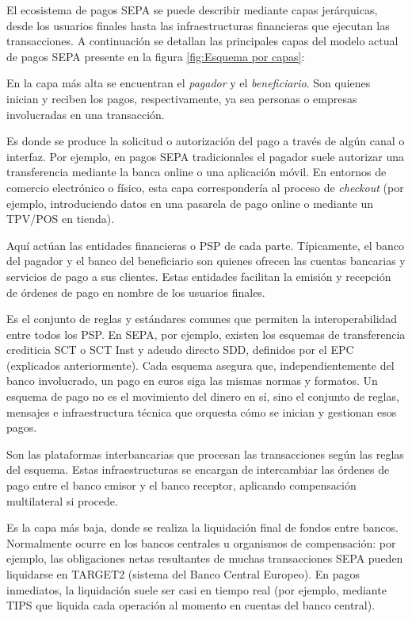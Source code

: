 El ecosistema de pagos SEPA se puede describir mediante capas jerárquicas, desde los usuarios finales hasta las infraestructuras financieras que ejecutan las transacciones. A continuación se detallan las principales capas del modelo actual de pagos SEPA presente en la figura \ref{fig:Esquema por capas}:

\begin{description}[itemsep=15pt, parsep=0pt]
  \item[\textbf{Capa de usuarios finales.}] 
    En la capa más alta se encuentran el \emph{pagador} y el \emph{beneficiario}. Son quienes inician y reciben los pagos, respectivamente, ya sea personas o empresas involucradas en una transacción.
  \item[\textbf{Capa de iniciación o interacción.}] 
    Es donde se produce la solicitud o autorización del pago a través de algún canal o interfaz. Por ejemplo, en pagos SEPA tradicionales el pagador suele autorizar una transferencia mediante la banca online o una aplicación móvil. En entornos de comercio electrónico o físico, esta capa correspondería al proceso de \emph{checkout} (por ejemplo, introduciendo datos en una pasarela de pago online o mediante un TPV/POS en tienda).
  \item[\textbf{Capa de proveedores de servicios de pago (PSP).}] 
    Aquí actúan las entidades financieras o PSP de cada parte. Típicamente, el banco del pagador y el banco del beneficiario son quienes ofrecen las cuentas bancarias y servicios de pago a sus clientes. Estas entidades facilitan la emisión y recepción de órdenes de pago en nombre de los usuarios finales.
  \item[\textbf{Capa de esquemas de pago SP.}] 
    Es el conjunto de reglas y estándares comunes que permiten la interoperabilidad entre todos los PSP. En SEPA, por ejemplo, existen los esquemas de transferencia crediticia SCT o SCT Inst y adeudo directo SDD, definidos por el EPC (explicados anteriormente). Cada esquema asegura que, independientemente del banco involucrado, un pago en euros siga las mismas normas y formatos. Un esquema de pago no es el movimiento del dinero en sí, sino el conjunto de reglas, mensajes e infraestructura técnica que orquesta cómo se inician y gestionan esos pagos.
  \item[\textbf{Capa de infraestructuras de compensación.}] 
    Son las plataformas interbancarias que procesan las transacciones según las reglas del esquema. Estas infraestructuras se encargan de intercambiar las órdenes de pago entre el banco emisor y el banco receptor, aplicando compensación multilateral si procede.
  \item[\textbf{Capa de liquidación.}] 
    Es la capa más baja, donde se realiza la liquidación final de fondos entre bancos. Normalmente ocurre en los bancos centrales u organismos de compensación: por ejemplo, las obligaciones netas resultantes de muchas transacciones SEPA pueden liquidarse en TARGET2 (sistema del Banco Central Europeo). En pagos inmediatos, la liquidación suele ser casi en tiempo real (por ejemplo, mediante TIPS \cite{ECB_TIPS} que liquida cada operación al momento en cuentas del banco central).
\end{description}

